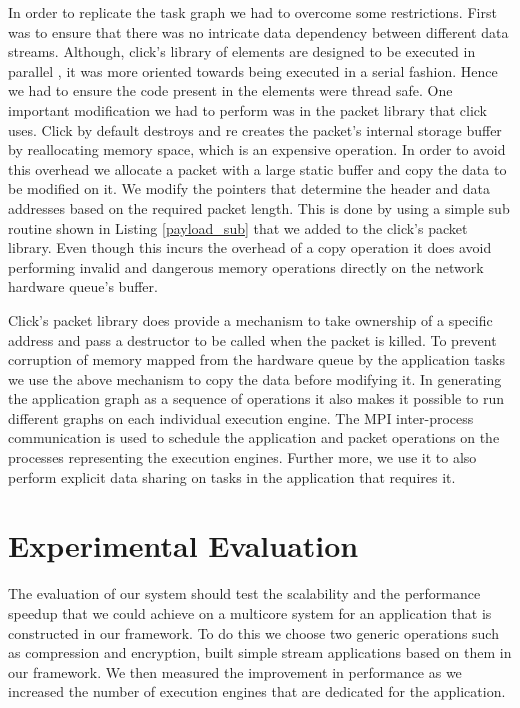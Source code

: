 \documentclass[conference]{IEEEtran}
\begin{document}
In order to replicate the task graph we had to overcome some restrictions. First was to ensure that there was no intricate data dependency between different data streams. Although, click's library of elements are designed to be executed in parallel \cite{Chen:2001:FCP:647055.759948}, it was more oriented towards being executed in a serial fashion. Hence we had to ensure the code present in the elements were thread safe. One important modification we had to perform was in the packet library that click uses. Click by default destroys and re creates the packet's internal storage buffer by reallocating memory space, which is an expensive operation. In order to avoid this overhead we allocate a packet with a large static buffer and copy the data to be modified on it. We modify the pointers that determine the header and data addresses based on the required packet length. This is done by using a simple sub routine shown in Listing \ref{payload_sub} that we added to the click's packet library. Even though this incurs the overhead of a copy operation it does avoid performing invalid and dangerous memory operations directly on the network hardware queue's buffer.

Click's packet library does provide a mechanism to take ownership of a specific address and pass a destructor to be called when the packet is killed. To prevent corruption of memory mapped from the hardware queue by the application tasks we use the above mechanism to copy the data before modifying it. In generating the application graph as a sequence of operations it also makes it possible to run different graphs on each individual execution engine. The MPI inter-process communication is used to schedule the application and packet operations on the processes representing the execution engines. Further more, we use it to also perform explicit data sharing on tasks in the application that requires it.

\section{Experimental Evaluation}

The evaluation of our system should test the scalability and the performance speedup that we could achieve on a multicore system for an application that is constructed in our framework. To do this we choose two generic operations such as compression and encryption, built simple stream applications based on them in our framework. We then measured the improvement in performance as we increased the number of execution engines that are dedicated for the application.
\end{document}
